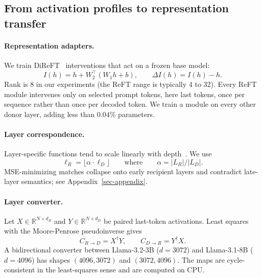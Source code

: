 \subsection{From activation profiles to representation transfer}

\paragraph{Representation adapters.}
We train DiReFT~\cite{wu2024reft} interventions that act on a frozen base model:
\begin{equation}
I(h)=h+W_2^{\top}(W_1 h+b),\qquad \Delta I(h)=I(h)-h.
\end{equation}
Rank is 8 in our experiments (the ReFT range is typically 4 to 32).
Every ReFT module intervenes only on selected prompt tokens, here last tokens, once per sequence rather than once per decoded token.
We train a module on every other donor layer, adding less than $0.04\%$ parameters.

\paragraph{Layer correspondence.}
Layer-specific functions tend to scale linearly with depth~\cite{tenney2019}.
We use
\begin{equation}
\ell_R=\lfloor\alpha\cdot \ell_D\rfloor\qquad\text{where}\qquad\alpha=|L_R|/|L_D|.
\end{equation}
MSE-minimizing matches collapse onto early recipient layers and contradict late-layer semantics; see Appendix~\ref{sec-appendix}.


\paragraph{Layer converter.}
Let $X\in\mathbb{R}^{N\times d_R}$ and $Y\in\mathbb{R}^{N\times d_D}$ be paired last-token activations.
Least squares with the Moore-Penrose pseudoinverse gives
\begin{equation}
C_{R\to D}=X^{\dagger}Y,\qquad C_{D\to R}=Y^{\dagger}X.
\end{equation}
A bidirectional converter between Llama-3.2-3B ($d=3072$) and Llama-3.1-8B ($d=4096$) has shapes $(4096,3072)$ and $(3072,4096)$.
The maps are cycle-consistent in the least-squares sense and are computed on CPU.

